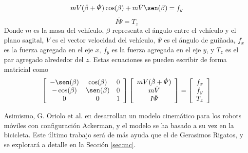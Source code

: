 \begin{equation} \label{eq:lat}
	mV(\dot{\beta}+\dot{\varPsi})\cos(\beta)+m\dot{V}\sen(\beta)=f_{y}
\end{equation}
\begin{equation} \label{eq:yaw}
	I\ddot{\varPsi}=T_{z}
\end{equation}
Donde $m$ es la masa del vehículo, $\beta$ representa el ángulo entre el vehículo y el plano sagital, $V$ es el vector velocidad del vehículo, $\varPsi$ es el ángulo de guiñada, $f_{x}$ es la fuerza agregada en el eje $x$, $f_{y}$ es la fuerza agregada en el eje $y$, y $T_{z}$ es el par agregado alrededor del $z$. Estas ecuaciones se pueden escribir de forma matricial como
\begin{equation}
	\left[\begin{array}{ccc}
	-\sen(\beta) & \cos(\beta) & 0\\
	-\cos(\beta) & \sen(\beta) & 0\\
	0 & 0 & 1
	\end{array}\right]
	\left[\begin{array}{c}
	mV(\dot{\beta}+\dot{\varPsi})\\
	m\dot{V}\\
	I\ddot{\varPsi}
	\end{array}\right]=\left[\begin{array}{c}
	f_{x}\\
	f_{y}\\
	T_{z}
	\end{array}\right]
\end{equation}
\par Asimismo, G. Oriolo et al. en \cite{laumondRobotMotionPlanning1998} desarrollan un modelo cinemático para los robots móviles con configuración Ackerman, y el modelo se ha basado a su vez en la bicicleta. Este último trabajo será de más ayuda que el de Gerasimos Rigatos, y se explorará a detalle en la Sección \ref{sec:mc}.
